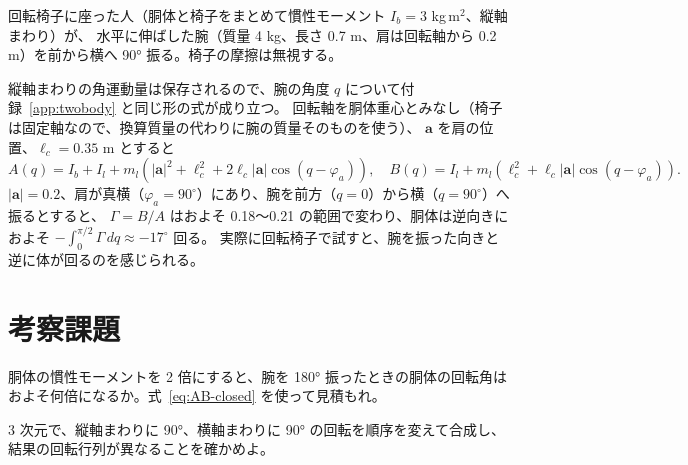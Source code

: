 \begin{example}
回転椅子に座った人（胴体と椅子をまとめて慣性モーメント $I_b = 3$ kg\,m$^2$、縦軸まわり）が、
水平に伸ばした腕（質量 4 kg、長さ 0.7 m、肩は回転軸から 0.2 m）を前から横へ 90° 振る。椅子の摩擦は無視する。

縦軸まわりの角運動量は保存されるので、腕の角度 $q$ について付録~\ref{app:twobody} と同じ形の式が成り立つ。
回転軸を胴体重心とみなし（椅子は固定軸なので、換算質量の代わりに腕の質量そのものを使う）、
$\bm a$ を肩の位置、$\ell_c=0.35$ m とすると
\[
A(q) = I_b + I_l + m_l\left(|\bm a|^2+\ell_c^2+2\ell_c|\bm a|\cos(q-\varphi_a)\right),\quad
B(q) = I_l + m_l\left(\ell_c^2+\ell_c|\bm a|\cos(q-\varphi_a)\right).
\]
$|\bm a| = 0.2$、肩が真横（$\varphi_a=90^\circ$）にあり、腕を前方（$q=0$）から横（$q=90^\circ$）へ振るとすると、
$\Gamma = B/A$ はおよそ 0.18〜0.21 の範囲で変わり、胴体は逆向きにおよそ $-\int_0^{\pi/2}\Gamma\,dq \approx -17^\circ$ 回る。
実際に回転椅子で試すと、腕を振った向きと逆に体が回るのを感じられる。
\end{example}

\section*{考察課題}
\begin{exercise}
胴体の慣性モーメントを 2 倍にすると、腕を 180° 振ったときの胴体の回転角はおよそ何倍になるか。式~\eqref{eq:AB-closed} を使って見積もれ。
\end{exercise}
\begin{exercise}
3 次元で、縦軸まわりに 90°、横軸まわりに 90° の回転を順序を変えて合成し、結果の回転行列が異なることを確かめよ。
\end{exercise}
